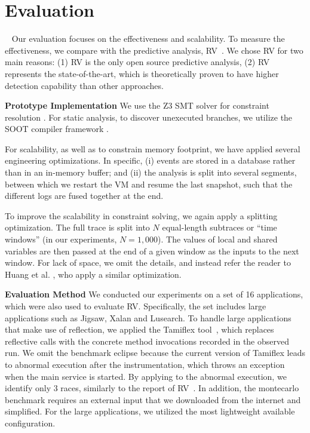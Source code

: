 \section{Evaluation}~\label{sec:eval}
Our evaluation focuses on the effectiveness  and scalability.
To measure the effectiveness, we compare with the predictive analysis, 
{\sf RV}~\cite{}. We chose RV for two main reasons: (1) {\sf RV} is the 
only open source predictive analysis, (2) {\sf RV} represents the 
state-of-the-art, which is theoretically proven to have higher detection 
capability than other approaches. 

{\bf Prototype Implementation}  We use the Z3 SMT solver for constraint 
resolution \cite{MouraB08}. For static analysis, to discover unexecuted 
branches, we utilize the SOOT compiler framework \cite{Vallee-RaiCGHLS99}.

For scalability, as well as to constrain memory footprint, we have 
applied several engineering optimizations. In specific, (i) events are 
stored in a database rather than in an in-memory buffer; and (ii) the 
analysis is split into several segments, between which we restart 
the VM and resume the last snapshot, such that the different logs 
are fused together at the end. 

To improve the scalability in constraint solving, we again apply 
a splitting optimization. The full trace is split into $N$ equal-length 
subtraces or ``time windows'' (in our experiments, $N=1,000$). The values 
of local and shared variables are then passed at the end of a 
given window as the inputs to the next window. For lack of space, we 
omit the details, and instead refer the reader to 
Huang et al. \cite{HuangMR14}, who apply a similar optimization.


{\bf Evaluation Method} We conducted our experiments on a set of 16 
applications, which were also used to evaluate {\sf RV}. Specifically, 
the set includes large applications such as {\sf Jigsaw}, 
{\sf Xalan} and {\sf Lusearch}. To handle large applications that make 
use of reflection, we applied the {\sf Tamiflex} tool~\cite{}, which 
replaces reflective calls with the concrete method invocations recorded 
in the observed run.
We omit the benchmark {\sf eclipse} because the current version 
of {\sf Tamiflex}  leads to abnormal execution after the instrumentation, 
which throws an exception when the main service is started. 
By applying \tool to the abnormal execution, we identify only 3 races, 
similarly to the report of RV~\cite{}.
In addition, the {\sf montecarlo} benchmark requires an external input 
that we downloaded from the internet and simplified. For the large 
applications, we utilized the most lightweight available configuration.


